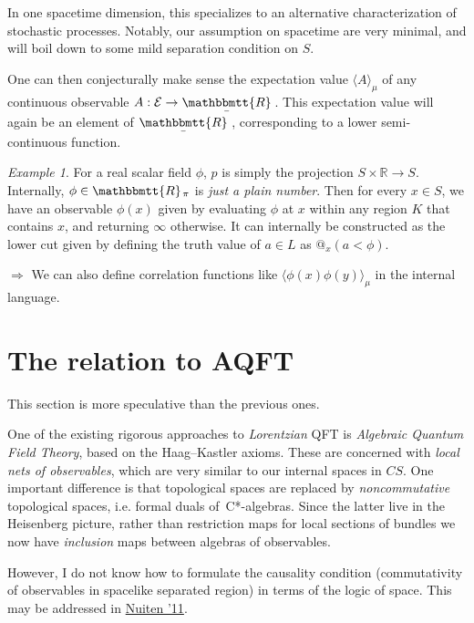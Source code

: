 \documentclass[11pt, oneside, article]{memoir}
\makeatletter
\theoremstyle{plain}
\theoremstyle{definition}
\theoremstyle{remark}
\newtheorem{example}[theorem]{Example}
\newcommand{\R}{\mathbb{R}}
\newcommand{\ubar}[1]{\underaccent{\bar}{#1}}
\newcommand{\internal}[1]{\raisebox{-.03ex}{$\mathbbmtt{#1}$}}
\newcommand{\hs}{\hspace{1.1pt}}
\newcommand{\tRR}{\internal{R}\hs}
\newcommand{\tLR}{\ubar{\tRR}\hs}
\newcommand{\AtSymbol}{{@}}
\newcommand{\At}[2][]{\AtSymbol^{#1}_{#2}}
\makeatother
\begin{document}
In one spacetime dimension, this specializes to an alternative characterization of stochastic processes. Notably, our assumption on spacetime are very minimal, and will boil down to some mild separation condition on $S$.

One can then conjecturally make sense the expectation value $\langle A \rangle_\mu$ of any continuous observable $A : \mathcal{E} \to \tLR$. This expectation value will again be an element of $\tLR$, corresponding to a lower semi-continuous function.

\begin{example}
For a real scalar field $\phi$, $p$ is simply the projection $S \times \R \to S$. Internally, $\phi \in \tRR_\pi$ is \emph{just a plain number}. Then for every $x\in S$, we have an observable $\phi(x)$ given by evaluating $\phi$ at $x$ within any region $K$ that contains $x$, and returning $\infty$ otherwise. It can internally be constructed as the lower cut given by defining the truth value of $a\in L$ as $\At{x}(a < \phi)$.

$\Rightarrow$ We can also define correlation functions like $\langle \phi(x) \phi(y) \rangle_\mu$ in the internal language.
\end{example}


\chapter{The relation to AQFT}

This section is more speculative than the previous ones.

One of the existing rigorous approaches to \emph{Lorentzian} QFT is \emph{Algebraic Quantum Field Theory}, based on the Haag--Kastler axioms. These are concerned with \emph{local nets of observables}, which are very similar to our internal spaces in $CS$. One important difference is that topological spaces are replaced by \emph{noncommutative} topological spaces, i.e. formal duals of~C*-algebras. Since the latter live in the Heisenberg picture, rather than restriction maps for local sections of bundles we now have \emph{inclusion} maps between algebras of observables.

However, I do not know how to formulate the causality condition (commutativity of observables in spacelike separated region) in terms of the logic of space. This may be addressed in \href{https://arxiv.org/abs/1109.1397}{Nuiten '11}.
\end{document}
